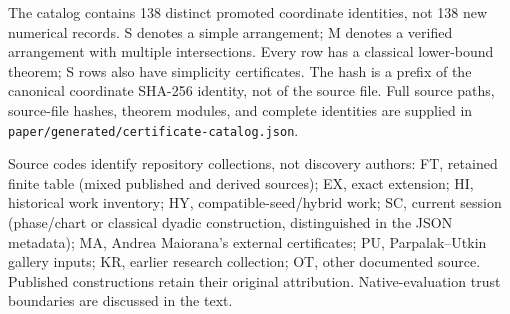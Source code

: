 \noindent The catalog contains 138 distinct promoted coordinate identities, not 138 new numerical records. S denotes a simple arrangement; M denotes a verified arrangement with multiple intersections. Every row has a classical lower-bound theorem; S rows also have simplicity certificates. The hash is a prefix of the canonical coordinate SHA-256 identity, not of the source file. Full source paths, source-file hashes, theorem modules, and complete identities are supplied in \texttt{paper/generated/certificate-catalog.json}.

\noindent Source codes identify repository collections, not discovery authors: FT, retained finite table (mixed published and derived sources); EX, exact extension; HI, historical work inventory; HY, compatible-seed/hybrid work; SC, current session (phase/chart or classical dyadic construction, distinguished in the JSON metadata); MA, Andrea Maiorana's external certificates; PU, Parpalak--Utkin gallery inputs; KR, earlier research collection; OT, other documented source. Published constructions retain their original attribution. Native-evaluation trust boundaries are discussed in the text.

